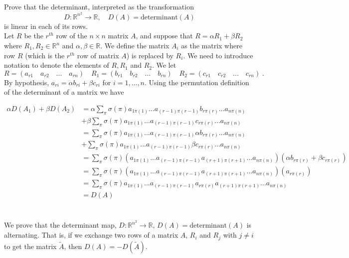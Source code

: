 \documentclass[11pt]{article}
\begin{document}
\section{}

Prove that the determinant, interpreted as the transformation $$D : \mathbb{R}^{n^2} \rightarrow \mathbb{R}, \quad D(A) = \text{determinant}(A) $$ is linear in each of its rows.\\

Let $R$ be the $r^{th}$ row of the $n\times n$ matrix $A$, and suppose that $R = \alpha R_1 + \beta R_2$ where $R_1,R_2 \in \mathbb{R}^n$ and $\alpha,\beta \in \mathbb{R}$. We define the matrix $A_i$ as the matrix where row $R$ (which is the $r^{th}$ row of matrix $A$) is replaced by $R_i$. We need to introduce notation to denote the elements of $R,R_1$ and $R_2$. We let $$R = (a_{r1}\quad a_{r2}\quad ... \quad a_{rn}) \quad R_1 = (b_{r1}\quad b_{r2}\quad ... \quad b_{rn}) \quad R_2 = (c_{r1}\quad c_{r2}\quad ... \quad c_{rn}) \;.$$By hypothesis, $a_{ri} = \alpha b_{ri} + \beta c_{ri}$ for $i = 1,...,n$. Using the permutation definition of the determinant of a matrix we have

\begin{align*}
\alpha D(A_1) + \beta D(A_2) &= \alpha\sum_{\pi} \sigma(\pi) a_{1\pi(1)}...a_{(r-1)\pi(r-1)}b_{r\pi(r)}...a_{n\pi(n)}\\ &+ \beta\sum_{\pi} \sigma(\pi) a_{1\pi(1)}...a_{(r-1)\pi(r-1)}c_{r\pi(r)}...a_{n\pi(n)} \\
&= \sum_{\pi} \sigma(\pi) a_{1\pi(1)}...a_{(r-1)\pi(r-1)}\alpha b_{r\pi(r)}...a_{n\pi(n)}\\ &+\sum_{\pi} \sigma(\pi) a_{1\pi(1)}...a_{(r-1)\pi(r-1)}\beta c_{r\pi(r)}...a_{n\pi(n)} \\
&= \sum_{\pi} \sigma(\pi) (a_{1\pi(1)}...a_{(r-1)\pi(r-1)} a_{(r+1)\pi(r+1)}...a_{n\pi(n)})(\alpha b_{r\pi(r)} + \beta c_{r\pi(r)})\\
&= \sum_{\pi} \sigma(\pi) (a_{1\pi(1)}...a_{(r-1)\pi(r-1)} a_{(r+1)\pi(r+1)}...a_{n\pi(n)})(a_{r\pi(r)})\\
&= \sum_{\pi} \sigma(\pi) a_{1\pi(1)}...a_{(r-1)\pi(r-1)}a_{r\pi(r)} a_{(r+1)\pi(r+1)}...a_{n\pi(n)} \\
&= D(A)
\end{align*} 

\section{}

We prove that the determinant map, $D: \mathbb{R}^{n^2} \rightarrow \mathbb{R}$, $D(A) = \text{determinant}(A)$ is alternating. That is, if we exchange two rows of a matrix $A$, $R_i$ and $R_j$ with $j \neq i$ to get the matrix $\tilde{A}$, then $D(A) = -D(\tilde{A})$.  \\
\end{document}
